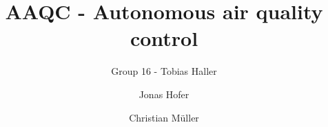 \documentclass[runningheads]{llncs}
\begin{document}
%
    \title{AAQC - Autonomous air quality control}


    \author{Group 16 - Tobias Haller \and Jonas Hofer \and Christian M\"uller}


%
    \maketitle              %
%
%    


    
    
    
    
    


%
%



\end{document}
